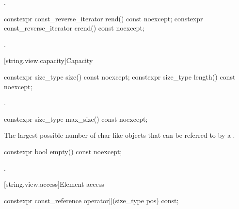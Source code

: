 \begin{itemdescr}
\pnum
\returns
{}.
\end{itemdescr}

%
%
\begin{itemdecl}
constexpr const_reverse_iterator rend() const noexcept;
constexpr const_reverse_iterator crend() const noexcept;
\end{itemdecl}

\begin{itemdescr}
\pnum
\returns
{}.
\end{itemdescr}

[string.view.capacity]{Capacity}

%
%
\begin{itemdecl}
constexpr size_type size() const noexcept;
constexpr size_type length() const noexcept;
\end{itemdecl}

\begin{itemdescr}
\pnum
\returns
{}.
\end{itemdescr}


%
\begin{itemdecl}
constexpr size_type max_size() const noexcept;
\end{itemdecl}

\begin{itemdescr}
\pnum
\returns
The largest possible number of char-like objects that can be referred to by a .
\end{itemdescr}

%
\begin{itemdecl}
constexpr bool empty() const noexcept;
\end{itemdecl}

\begin{itemdescr}
\pnum
\returns
{}.
\end{itemdescr}

[string.view.access]{Element access}

%
\begin{itemdecl}
constexpr const_reference operator[](size_type pos) const;
\end{itemdecl}

